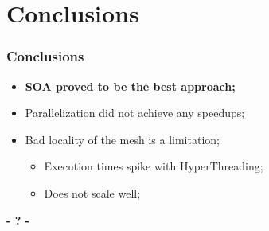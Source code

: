\documentclass{beamer}
\begin{document}
\section{Conclusions}

\begin{frame}
	\frametitle{Conclusions}
	\begin{itemize}
		\item \bfseries{SOA} proved to be the best approach;		
		\item Parallelization did not achieve any speedups;
		\item Bad locality of the mesh is a limitation;
		\begin{itemize}
			\item Execution times spike with HyperThreading;
			\item Does not scale well;
		\end{itemize}
	\end{itemize}


\end{frame}

\begin{frame}
\titlepage
	\begin{center}
		\Huge\bfseries
		- ? -
	\end{center}
\end{frame}
\end{document}
